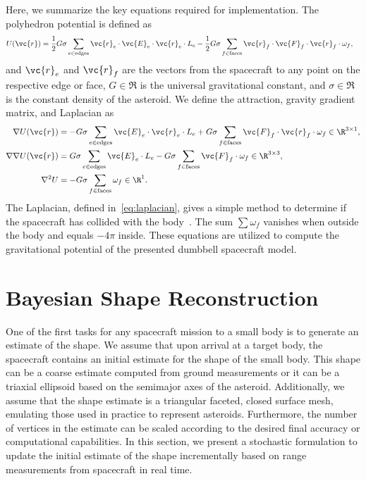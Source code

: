 \documentclass[smallextended]{svjour3}       %
\begin{document}
Here, we summarize the key equations required for implementation.
The polyhedron potential is defined as 
\begin{align}
    U(\vc{r}) &= \frac{1}{2} G \sigma \sum_{e \in \text{edges}} \vc{r}_e \cdot \vc{E}_e \cdot \vc{r}_e \cdot L_e - \frac{1}{2}G \sigma \sum_{f \in \text{faces}} \vc{r}_f \cdot \vc{F}_f \cdot \vc{r}_f \cdot \omega_f,
\end{align}
and \( \vc{r}_e\) and \(\vc{r}_f \) are the vectors from the spacecraft to any point on the respective edge or face, \( G\in\Re\) is the universal gravitational constant, and \( \sigma\in\Re \) is the constant density of the asteroid.
We define the attraction, gravity gradient matrix, and Laplacian as
\begin{align}
    \nabla U ( \vc{r} ) &= -G \sigma \sum_{e \in \text{edges}} \vc{E}_e \cdot \vc{r}_e \cdot L_e + G \sigma \sum_{f \in \text{faces}} \vc{F}_f \cdot \vc{r}_f \cdot \omega_f \in \R^{3 \times 1} , \label{eq:attraction}\\
    \nabla \nabla U ( \vc{r} ) &= G \sigma \sum_{e \in \text{edges}} \vc{E}_e  \cdot L_e - G \sigma \sum_{f \in \text{faces}} \vc{F}_f \cdot \omega_f \in \R^{3 \times 3}, \label{eq:gradient_matrix}\\
    \nabla^2 U &= -G \sigma \sum_{f \in \text{faces}}  \omega_f \in \R^1 .\label{eq:laplacian}
\end{align}
The Laplacian, defined in~\cref{eq:laplacian}, gives a simple method to determine if the spacecraft has collided with the body~\cite{werner1996}. 
The sum \( \sum \omega_f \) vanishes when outside the body and equals \( -4 \pi \) inside.
These equations are utilized to compute the gravitational potential of  the presented dumbbell spacecraft model.

\section{Bayesian Shape Reconstruction}\label{sec:radius_update}

One of the first tasks for any spacecraft mission to a small body is to generate an estimate of the shape.
We assume that upon arrival at a target body, the spacecraft contains an initial estimate for the shape of the small body.
This shape can be a coarse estimate computed from ground measurements or it can be a triaxial ellipsoid based on the semimajor axes of the asteroid.
Additionally, we assume that the shape estimate is a triangular faceted, closed surface mesh, emulating those used in practice to represent asteroids.
Furthermore, the number of vertices in the estimate can be scaled according to the desired final accuracy or computational capabilities.
In this section, we present a stochastic formulation to update the initial estimate of the shape incrementally based on range measurements from spacecraft in real time. 
\end{document}
